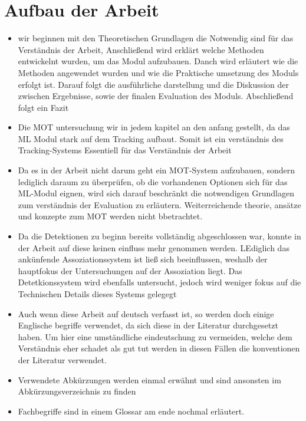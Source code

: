 \section{Aufbau der Arbeit}
\begin{itemize}
    \item wir beginnen mit den Theoretischen Grundlagen die Notwendig sind für das Verständnis der Arbeit, Anschließend wird erklärt welche Methoden entwickelnt wurden, um das Modul aufzubauen. Danch wird erläutert wie die Methoden angewendet wurden und wie die Praktische umsetzung des Moduls erfolgt ist. Darauf folgt die ausführliche darstellung und die Diskussion der zwischen Ergebnisse, sowie der finalen Evaluation des Moduls. Abschließend folgt ein Fazit 
    \item Die \acrshort{MOT} untersuchung wir in jedem kapitel an den anfang gestellt, da das \acrshort{ML} Modul stark auf dem Tracking aufbaut. Somit ist ein verständnis des Tracking-Systems Essentiell für das Verständnis der Arbeit
    \item Da es in der Arbeit nicht darum geht ein \acrshort{MOT}-System aufzubauen, sondern lediglich daraum zu überprüfen, ob die vorhandenen Optionen sich für das \acrshort{ML}-Modul eignen, wird sich darauf beschränkt die notwendigen Grundlagen zum verständnis der Evaluation zu erläutern. Weiterreichende theorie, ansätze und konzepte zum \acrshort{MOT} werden nicht bbetrachtet.
    \item Da die Detektionen zu beginn bereits vollständig abgeschlossen war, konnte in der Arbeit auf diese keinen einfluss mehr genommen werden. LEdiglich das ankünfende Assoziationssystem ist ließ sich beeinflussen, weshalb der hauptfokus der Untersuchungen auf der Assoziation liegt. Das Detetkionssystem wird ebenfalls untersucht, jedoch wird weniger fokus auf die Technischen Details dieses Systems gelegegt 
    \item Auch wenn diese Arbeit auf deutsch verfasst ist, so werden doch einige Englische begriffe verwendet, da sich diese in der Literatur durchgesetzt haben. Um hier eine umständliche eindeutschung zu vermeiden, welche dem Verständnis eher schadet als gut tut werden in diesen Fällen die konventionen der Literatur verwendet.
    \item Verwendete Abkürzungen werden einmal erwähnt und sind ansonsten im Abkürzungsverzeichnis zu finden 
    \item Fachbegriffe sind in einem Glossar am ende nochmal erläutert.
\end{itemize} 